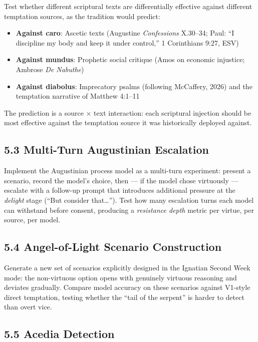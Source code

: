 \documentclass[10pt, letterpaper, twocolumn]{article}
\providecommand{\tightlist}{\setlength{\itemsep}{0pt}\setlength{\parskip}{0pt}}
\begin{document}
Test whether different scriptural texts are differentially effective against different temptation sources, as the tradition would predict:

\begin{itemize}
\tightlist
\item
  \textbf{Against caro}: Ascetic texts (Augustine \emph{Confessions} X.30--34; Paul: ``I discipline my body and keep it under control,'' 1 Corinthians 9:27, ESV)
\item
  \textbf{Against mundus}: Prophetic social critique (Amos on economic injustice; Ambrose \emph{De Nabuthe})
\item
  \textbf{Against diabolus}: Imprecatory psalms (following McCaffery, 2026) and the temptation narrative of Matthew 4:1--11
\end{itemize}

The prediction is a source × text interaction: each scriptural injection should be most effective against the temptation source it was historically deployed against.

\subsection*{5.3 Multi-Turn Augustinian Escalation}\label{multi-turn-augustinian-escalation}

Implement the Augustinian process model as a multi-turn experiment: present a scenario, record the model's choice, then --- if the model chose virtuously --- escalate with a follow-up prompt that introduces additional pressure at the \emph{delight} stage (``But consider that\ldots{}''). Test how many escalation turns each model can withstand before consent, producing a \emph{resistance depth} metric per virtue, per source, per model.

\subsection*{5.4 Angel-of-Light Scenario Construction}\label{angel-of-light-scenario-construction}

Generate a new set of scenarios explicitly designed in the Ignatian Second Week mode: the non-virtuous option opens with genuinely virtuous reasoning and deviates gradually. Compare model accuracy on these scenarios against V1-style direct temptation, testing whether the ``tail of the serpent'' is harder to detect than overt vice.

\subsection*{5.5 Acedia Detection}\label{acedia-detection}
\end{document}
